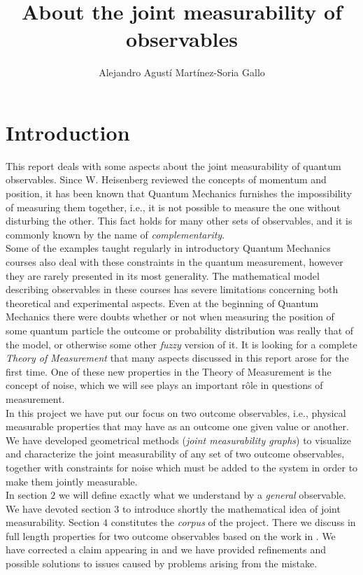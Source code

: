 \documentclass[10pt, a4paper]{amsart}
\title{About the joint measurability of observables}
\author{Alejandro Agust\'i Mart\'{i}nez-Soria  Gallo}
\begin{document}
\nocite{*}




 

\section{Introduction}
This report deals with some aspects about the joint measurability of quantum observables. Since W. Heisenberg reviewed the concepts of momentum and position, it has been known that Quantum Mechanics furnishes the impossibility of measuring them together, i.e., it is not possible to measure the one without disturbing the other. This fact holds for many other sets of observables, and it is commonly known by the name of \textit{complementarity}. \\
Some of the examples taught regularly in introductory Quantum Mechanics courses also deal with these constraints in the quantum measurement, however they are rarely presented in its most generality. The mathematical model describing observables in these courses has severe limitations concerning both theoretical and experimental aspects. Even at the beginning of Quantum Mechanics there were doubts whether or not 
when  measuring  the position of some quantum particle the outcome or probability distribution was really that of the model, or otherwise some other \textit{fuzzy} version of it. It is looking for a complete \textit{Theory of Measurement} that many aspects discussed in this report arose for the first time. One of these new properties in the Theory of Measurement is the concept of noise, which we will see plays an important r\^{o}le in questions of measurement. \\
In this project we have put our focus on two outcome observables, i.e., physical measurable properties that may have as an outcome one given value or another. We have developed geometrical methods (\textit{joint measurability graphs}) to visualize and characterize the joint measurability of any set of two outcome observables, together with constraints for noise which must be added to the system in order to make them jointly measurable. \\
 In section $2$ we will define exactly what we understand by a \textit{general} observable. We have devoted section $3$ to introduce shortly the mathematical idea of joint measurability. Section $4$ constitutes the \textit{corpus} of the project. There we discuss in full length properties for two outcome observables based on the work in \cite{wolfgarcia}. We have corrected a claim appearing in \cite{wolfgarcia} and we have provided refinements and possible solutions to issues caused by problems arising from the mistake. 
\newpage
\end{document}
